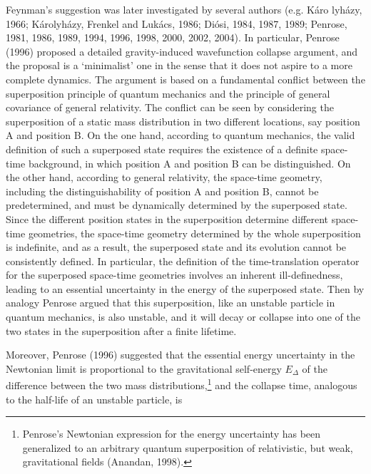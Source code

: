 Feynman's suggestion was later investigated by several authors (e.g. K\'{a}ro lyh\'{a}zy, 1966; K\'{a}rolyh\'{a}zy, Frenkel and Luk\'{a}cs, 1986; Di\'{o}si, 1984, 1987, 1989; Penrose, 1981, 1986, 1989, 1994, 1996, 1998, 2000, 2002, 2004). In particular, Penrose (1996) proposed a detailed gravity-induced wavefunction collapse argument, and the proposal is a `minimalist' one in the sense that it does not aspire to a more complete dynamics. The argument is based on a fundamental conflict between the superposition principle of quantum mechanics and the principle of general covariance of general relativity. The conflict can be seen by considering the superposition of a static mass distribution in two different locations, say position A and position B. On the one hand, according to quantum mechanics, the valid definition of such a superposed state requires the existence of a definite space-time background, in which position A and position B can be distinguished. On the other hand, according to general relativity, the space-time geometry, including the distinguishability of position A and position B, cannot be predetermined, and must be dynamically determined by the superposed state. Since the different position states in the superposition determine different space-time geometries, the space-time geometry determined by the whole superposition is indefinite, and as a result, the superposed state and its evolution cannot be consistently defined. In particular, the definition of the time-translation operator for the superposed space-time geometries involves an inherent ill-definedness, leading to an essential uncertainty in the energy of the superposed state. Then by analogy Penrose argued that this superposition, like an unstable particle in quantum mechanics, is also unstable, and it will decay or collapse into one of the two states in the superposition after a finite lifetime. 

Moreover, Penrose (1996) suggested that the essential energy uncertainty in the Newtonian limit is proportional to the gravitational self-energy $E_{\Delta}$ of the difference between the two mass distributions,\footnote{Penrose's Newtonian expression for the energy uncertainty has been generalized to an arbitrary quantum superposition of relativistic, but weak, gravitational fields (Anandan, 1998).} and the collapse time, analogous to the half-life of an unstable particle, is 

